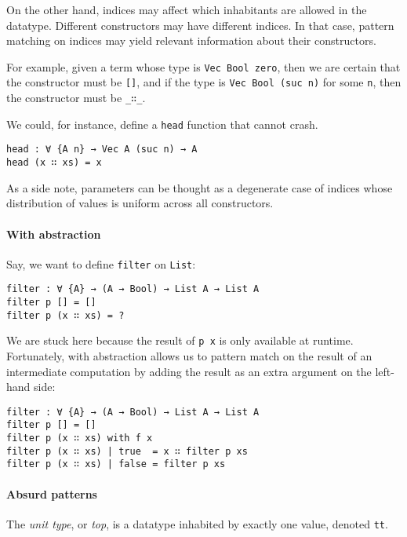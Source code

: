 \documentclass[../thesis.tex]{subfiles}
\begin{document}
On the other hand, indices may affect which inhabitants are allowed in the
datatype. Different constructors may have different indices. In that case, pattern
matching on indices may yield relevant information about their constructors.

For example, given a term whose type is {\lstinline|Vec Bool zero|},
then we are certain that the constructor must be {\lstinline|[]|},
and if the type is {\lstinline|Vec Bool (suc n)|} for some {\lstinline|n|},
then the constructor must be {\lstinline|_∷_|}.

We could, for instance, define a {\lstinline|head|} function that cannot crash.

\begin{lstlisting}
head : ∀ {A n} → Vec A (suc n) → A
head (x ∷ xs) = x
\end{lstlisting}

As a side note, parameters can be thought as a degenerate case of indices whose
distribution of values is uniform across all constructors.

\paragraph{With abstraction}


Say, we want to define {\lstinline|filter|} on {\lstinline|List|}:

\begin{lstlisting}
filter : ∀ {A} → (A → Bool) → List A → List A
filter p [] = []
filter p (x ∷ xs) = ?
\end{lstlisting}

We are stuck here because the result of {\lstinline|p x|} is only available at
runtime. Fortunately, with abstraction allows us to pattern match on the result
of an intermediate computation by adding the result as an extra argument on the
left-hand side:

\begin{lstlisting}
filter : ∀ {A} → (A → Bool) → List A → List A
filter p [] = []
filter p (x ∷ xs) with f x
filter p (x ∷ xs) | true  = x ∷ filter p xs
filter p (x ∷ xs) | false = filter p xs
\end{lstlisting}

\paragraph{Absurd patterns}

The \textit{unit type}, or \textit{top}, is a datatype inhabited by
exactly one value, denoted {\lstinline|tt|}.
\end{document}

